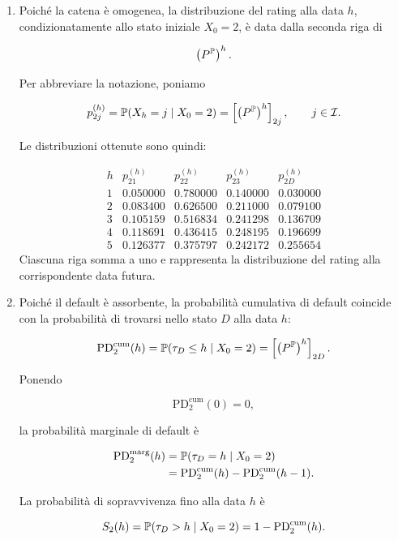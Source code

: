 \begin{enumerate}

\item Poich\'{e} la catena \`{e} omogenea, la distribuzione del rating
alla data $h$, condizionatamente allo stato iniziale $X_0=2$, \`{e}
data dalla seconda riga di

\[
\left(P^{\mathbb{P}}\right)^h.
\]

Per abbreviare la notazione, poniamo

\[
p_{2j}^{(h)}
=
\mathbb{P}(X_h=j\mid X_0=2)
=
\left[
\left(P^{\mathbb{P}}\right)^h
\right]_{2j},
\qquad
j\in\mathcal{I}.
\]

Le distribuzioni ottenute sono quindi:

\[
\begin{array}{c|cccc}
h
&
p_{21}^{(h)}
&
p_{22}^{(h)}
&
p_{23}^{(h)}
&
p_{2D}^{(h)}
\\
\hline
1 & 0.050000 & 0.780000 & 0.140000 & 0.030000\\
2 & 0.083400 & 0.626500 & 0.211000 & 0.079100\\
3 & 0.105159 & 0.516834 & 0.241298 & 0.136709\\
4 & 0.118691 & 0.436415 & 0.248195 & 0.196699\\
5 & 0.126377 & 0.375797 & 0.242172 & 0.255654
\end{array}
\]
Ciascuna riga somma a uno e rappresenta la distribuzione del rating
alla corrispondente data futura.

\item Poich\'{e} il default \`{e} assorbente, la probabilit\`{a}
cumulativa di default coincide con la probabilit\`{a} di trovarsi
nello stato $D$ alla data $h$:

\[
\mathrm{PD}_{2}^{\mathrm{cum}}(h)
=
\mathbb{P}(\tau_D\leq h\mid X_0=2)
=
\left[
\left(P^{\mathbb{P}}\right)^h
\right]_{2D}.
\]

Ponendo

\[
\mathrm{PD}_{2}^{\mathrm{cum}}(0)=0,
\]

la probabilit\`{a} marginale di default \`{e}

\[
\begin{split}
\mathrm{PD}_{2}^{\mathrm{marg}}(h)
&=
\mathbb{P}(\tau_D=h\mid X_0=2)
\\
&=
\mathrm{PD}_{2}^{\mathrm{cum}}(h)
-
\mathrm{PD}_{2}^{\mathrm{cum}}(h-1).
\end{split}
\]

La probabilit\`{a} di sopravvivenza fino alla data $h$ \`{e}

\[
S_2(h)
=
\mathbb{P}(\tau_D>h\mid X_0=2)
=
1-\mathrm{PD}_{2}^{\mathrm{cum}}(h).
\]


\end{enumerate}
